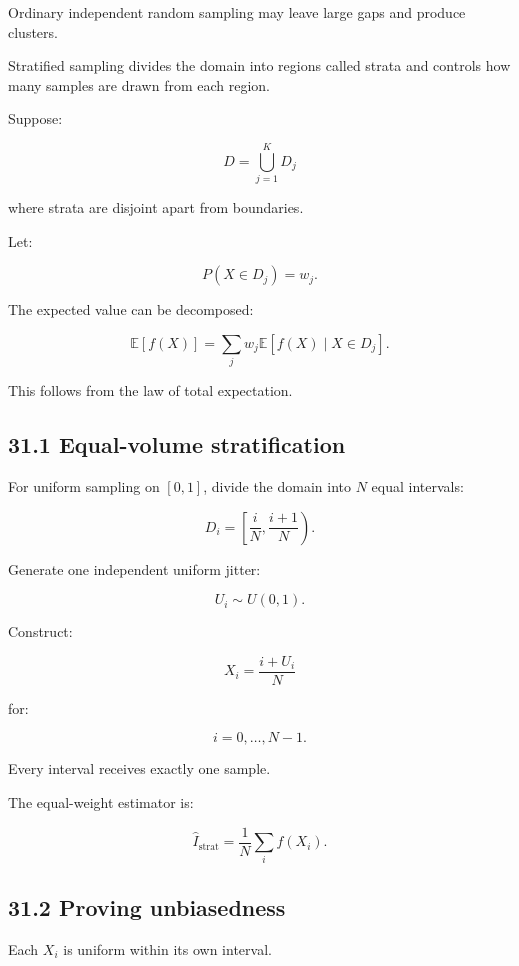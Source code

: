 Ordinary independent random sampling may leave large gaps and produce clusters.

Stratified sampling divides the domain into regions called strata and controls how many samples are drawn from each region.

Suppose:

\[ D=\bigcup_{j=1}^{K}D_j \]

where strata are disjoint apart from boundaries.

Let:

\[ P(X\in D_j)=w_j. \]

The expected value can be decomposed:

\[ \mathbb E[f(X)] = \sum_jw_j\mathbb E[f(X)\mid X\in D_j]. \]

This follows from the law of total expectation.

\subsection{31.1 Equal-volume stratification}\label{02-foundations-ii-ch031-equal-volume-stratification}

\hypertarget{02-foundations-ii-ch031-equal-volume-stratification}{}

For uniform sampling on \([0,1]\), divide the domain into \(N\) equal intervals:

\[ D_i= \left[\frac iN,\frac{i+1}{N}\right). \]

Generate one independent uniform jitter:

\[ U_i\sim U(0,1). \]

Construct:

\[ \boxed{ X_i=\frac{i+U_i}{N} } \]

for:

\[ i=0,\ldots,N-1. \]

Every interval receives exactly one sample.

The equal-weight estimator is:

\[ \boxed{ \widehat I_{\mathrm{strat}} = \frac1N\sum_i f(X_i) }. \]

\subsection{31.2 Proving unbiasedness}\label{02-foundations-ii-ch031-proving-unbiasedness}

\hypertarget{02-foundations-ii-ch031-proving-unbiasedness}{}

Each \(X_i\) is uniform within its own interval.

